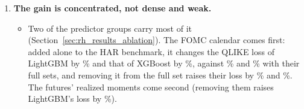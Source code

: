 \begin{itemize}
\begin{enumerate}
\begin{itemize}
      \citep{PattonSheppard2015,BollerslevPattonQuaedvlieg2016,CorsiReno2012}, estimated together by OLS, change the
      benchmark's loss by \rhabOlsSharqlAllPct\%.
    \item The result holds at a window of \rhrbWinLong{} trading days (\rhrbNFullLowerSigBarLong{} of
      \rhrbNModelsLong{} classes; Section~\ref{sec:rh_results_robust}).
    \end{itemize}
  \item \textbf{The gain is concentrated, not dense and weak.}
    \begin{itemize}
    \item Two of the \bkNBuckets{} predictor groups carry most of it (Section~\ref{sec:rh_results_ablation}). The
      FOMC calendar comes first: added alone to the HAR benchmark, it changes the QLIKE loss of LightGBM by
      \rhabLgbmAddFomcAllPct\% and that of XGBoost by \rhabXgbAddFomcAllPct\%, against \rhabLgbmFullAllPct\% and
      \rhabXgbFullAllPct\% with their full sets, and removing it from the full set raises their loss by
      \rhabLgbmLoFomcAllPct\% and \rhabXgbLoFomcAllPct\%. The futures' realized moments come second (removing them
      raises LightGBM's loss by \rhabLgbmLoRmAllPct\%).

\end{itemize}
\end{enumerate}
\end{itemize}
